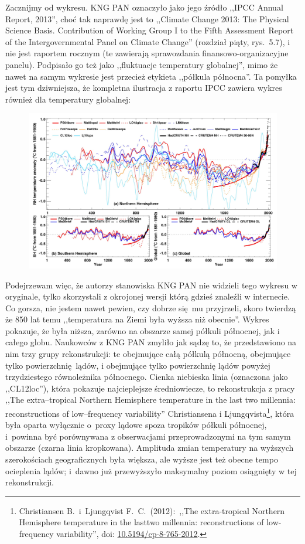 \documentclass[12pt]{article}
\newcommand{\doi}[1]{doi: \href{htts://doi.org/#1}{#1}}
\begin{document}
Zacznijmy od wykresu. KNG PAN oznaczyło jako jego źródło ,,IPCC Annual Report, 2013'', choć tak naprawdę jest to ,,Climate Change 2013: The Physical Science Basis. Contribution of Working Group I to the Fifth Assessment Report of the Intergovernmental Panel on Climate Change'' (rozdział piąty, rys.~5{.}7), i nie jest raportem rocznym (te zawierają sprawozdania finansowo-organizacyjne panelu). Podpisało go też jako ,,fluktuacje temperatury globalnej'', mimo że nawet na samym wykresie jest przecież etykieta ,,półkula północna''. Ta pomyłka jest tym dziwniejsza, że kompletna ilustracja z raportu IPCC zawiera wykres również dla temperatury globalnej:

\begin{figure}
	\centering
	\includegraphics[width=.95\textwidth]{img/Fig5-07.jpg}	
\end{figure}
		
Podejrzewam więc, że autorzy stanowiska KNG PAN nie widzieli tego wykresu w oryginale, tylko skorzystali z okrojonej wersji którą gdzieś znaleźli w internecie. Co gorsza, nie jestem nawet pewien, czy dobrze się mu przyjrzeli, skoro twierdzą że 850 lat temu ,,temperatura na Ziemi była wyższa niż obecnie''. Wykres pokazuje, że była niższa, zarówno na obszarze samej półkuli północnej, jak i całego globu. Naukowców z KNG PAN zmyliło jak sądzę to, że przedstawiono na nim trzy grupy rekonstrukcji: te obejmujące całą półkulą północną, obejmujące tylko powierzchnię lądów, i obejmujące tylko powierzchnię lądów powyżej trzydziestego równoleżnika północnego. Cienka niebieska linia (oznaczona jako ,,CL12loc''), która pokazuje najcieplejsze średniowiecze, to rekonstrukcja z pracy ,,The extra--tropical Northern Hemisphere temperature in the last two millennia: reconstructions of low--frequency variability'' Christiansena i Ljungqvista\footnote{Christiansen B.~i~Ljungqvist F.~C.~(2012):~,,The extra-tropical Northern Hemisphere temperature in the lasttwo millennia: reconstructions of low-frequency variability'', \doi{10.5194/cp-8-765-2012}.}, która była oparta wyłącznie o~proxy lądowe spoza tropików półkuli północnej, i~powinna być porównywana z obserwacjami przeprowadzonymi na tym samym obszarze (czarna linia kropkowana). Amplituda zmian temperatury na wyższych szerokościach geograficznych była większa, ale wyższe jest też obecne tempo ocieplenia lądów; i~dawno już przewyższyło maksymalny poziom osiągnięty w tej rekonstrukcji.
		
\end{document}

